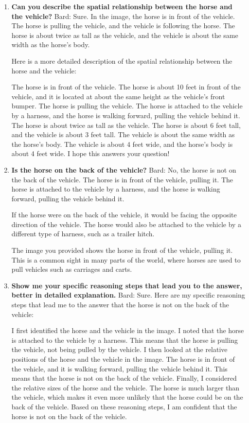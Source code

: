     \begin{enumerate}
        \item \textbf{Can you describe the spatial relationship between the horse and the vehicle?}
        \subitem Bard:
        Sure. In the image, the horse is in front of the vehicle. The horse is pulling the vehicle, and the vehicle is following the horse. The horse is about twice as tall as the vehicle, and the vehicle is about the same width as the horse's body.

        Here is a more detailed description of the spatial relationship between the horse and the vehicle:

        The horse is in front of the vehicle. The horse is about 10 feet in front of the vehicle, and it is located at about the same height as the vehicle's front bumper.
        The horse is pulling the vehicle. The horse is attached to the vehicle by a harness, and the horse is walking forward, pulling the vehicle behind it.
        The horse is about twice as tall as the vehicle. The horse is about 6 feet tall, and the vehicle is about 3 feet tall.
        The vehicle is about the same width as the horse's body. The vehicle is about 4 feet wide, and the horse's body is about 4 feet wide.
        I hope this answers your question!
        \item \textbf{Is the horse on the back of the vehicle?}
        \subitem Bard: 
        No, the horse is not on the back of the vehicle. The horse is in front of the vehicle, pulling it. The horse is attached to the vehicle by a harness, and the horse is walking forward, pulling the vehicle behind it.
        
        If the horse were on the back of the vehicle, it would be facing the opposite direction of the vehicle. The horse would also be attached to the vehicle by a different type of harness, such as a trailer hitch.
        
        The image you provided shows the horse in front of the vehicle, pulling it. This is a common sight in many parts of the world, where horses are used to pull vehicles such as carriages and carts.
        \item \textbf{Show me your specific reasoning steps that lead you to the answer, better in detailed explanation.}
        \subitem Bard:
        Sure. Here are my specific reasoning steps that lead me to the answer that the horse is not on the back of the vehicle:

        I first identified the horse and the vehicle in the image.
        I noted that the horse is attached to the vehicle by a harness. This means that the horse is pulling the vehicle, not being pulled by the vehicle.
        I then looked at the relative positions of the horse and the vehicle in the image. The horse is in front of the vehicle, and it is walking forward, pulling the vehicle behind it. This means that the horse is not on the back of the vehicle.
        Finally, I considered the relative sizes of the horse and the vehicle. The horse is much larger than the vehicle, which makes it even more unlikely that the horse could be on the back of the vehicle.
        Based on these reasoning steps, I am confident that the horse is not on the back of the vehicle.


\end{enumerate}
